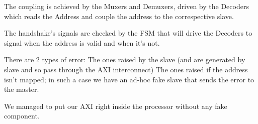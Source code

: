 {}
The coupling is achieved by the Muxers and Demuxers, driven by the Decoders which reads the Address and couple the address to the correspective slave.

{}
The handshake's signals are checked by the FSM that will drive the Decoders to signal when the address is valid and when it's not.

{}
There are 2 types of error:
The ones raised by the slave (and are generated by slave and so pass through the AXI interconnect)
The ones raised if the address isn't mapped; in such a case we have an ad-hoc fake slave that sends the error to the master.

{}
We managed to put our AXI right inside the processor without any fake component.
